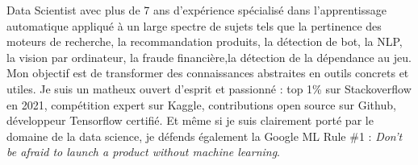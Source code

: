 

\begin{cvparagraph}

Data Scientist avec plus de 7 ans d'expérience spécialisé dans l'apprentissage automatique appliqué à un large spectre de sujets tels que la pertinence des moteurs de recherche, la recommandation produits, la détection de bot, la NLP, la vision par ordinateur, la fraude financière,la  détection de la dépendance au jeu.\newline
Mon objectif est de transformer des connaissances abstraites en outils concrets et utiles. Je suis un matheux ouvert d'esprit et passionné : top 1\% sur Stackoverflow en 2021, compétition expert sur Kaggle, contributions open source sur Github, développeur Tensorflow certifié. Et même si je suis clairement porté par le domaine de la data science, je défends également la Google ML Rule \#1 : \guillemotleft \textit{Don’t be afraid to launch a product without machine learning}\guillemotright.


\end{cvparagraph}

